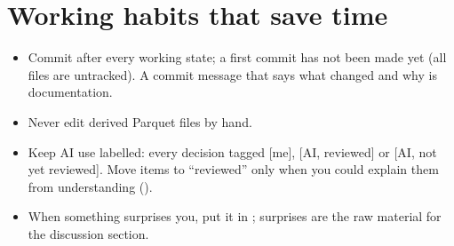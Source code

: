 \section{Working habits that save time}
\begin{itemize}
  \item Commit after every working state; a first commit has not been made yet (all files are untracked). A commit message that says what changed and why is documentation.
  \item Never edit derived Parquet files by hand.
  \item Keep AI use labelled: every decision tagged [me], [AI, reviewed] or [AI, not yet reviewed]. Move items to ``reviewed'' only when you could explain them from understanding ().
  \item When something surprises you, put it in ; surprises are the raw material for the discussion section.
\end{itemize}
